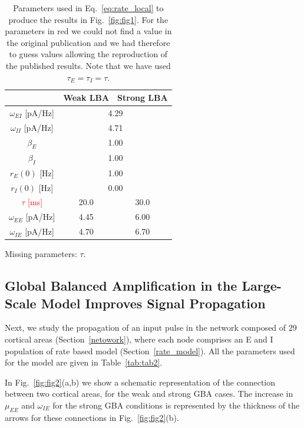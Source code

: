 \begin{table}[!ht]
\centering
\begin{tabular}{|c|c|c|}

\hline
                    & \textbf{Weak LBA} & \textbf{Strong LBA} \\ \hline
$\omega_{EI}$ [pA/Hz] & \multicolumn{2}{c|}{4.29}               \\ \hline
$\omega_{II}$ [pA/Hz] & \multicolumn{2}{c|}{4.71}               \\ \hline
$\beta_{E}$         & \multicolumn{2}{c|}{1.00}               \\ \hline
$\beta_{I}$         & \multicolumn{2}{c|}{1.00}               \\ \hline
$r_E(0)$ [Hz]           & \multicolumn{2}{c|}{1.00}               \\ \hline
$r_I(0)$ [Hz]           & \multicolumn{2}{c|}{0.00}               \\ \hline
\textcolor{red}{$\tau$ [ms]}           & 20.0              & 30.0                \\ \hline
$\omega_{EE}$ [pA/Hz] & 4.45              & 6.00                \\ \hline
$\omega_{IE}$ [pA/Hz] & 4.70              & 6.70                \\ \hline
\end{tabular}
\caption{Parameters used in Eq.~\ref{eq:rate_local} to produce the results in Fig.~\ref{fig:fig1}. For the parameters in red we could not find a value in the original publication and we had therefore to guess values allowing the reproduction of the published results. Note that we have used $\tau_{E} = \tau_{I} = \tau$.} Missing parameters: $\tau$.\label{tab:tab1}
\end{table}

\subsection{Global Balanced Amplification
in the Large-Scale Model Improves Signal Propagation}\label{gba_rate}

Next, we study the propagation of an input pulse in the network composed of $29$ cortical areas \cite{markov2014b} (Section~\ref{netowork}), where each node comprises an E and I population of rate based model (Section~\ref{rate_model}). All the parameters used for the model are given in Table~\ref{tab:tab2}.

In Fig.~\ref{fig:fig2}(a,b) we show a schematic representation of the connection between two cortical areas, for the weak and strong GBA cases. The increase in $\mu_{EE}$ and $\omega_{IE}$ for the strong GBA conditions is represented by the thickness of the arrows for these connections in  Fig.~\ref{fig:fig2}(b).

